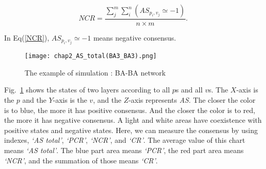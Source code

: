 \begin{equation}
NCR = \frac{{\sum\limits_j^m {\sum\limits_i^n {(A{S_{{p _i},{v _j}}} \simeq   - 1)} } }}{{n \times m}}.
\label{NCR}
\end{equation}

In Eq(\ref{NCR}), ${A{S_{{p _i},{v _j}}} \simeq  -1}$ means negative consensus.


\begin{figure}[!htb]
	\centering
	\texttt{[image: chap2\_AS\_total(BA3\_BA3).png]}
	\caption{The example of simulation : BA-BA network}
	\label{chap2_AS_total(BA3_BA3)}
\end{figure}

Fig.~\ref{chap2_AS_total(BA3_BA3)} shows the states of two layers according to all $p$s and all $v$s. The $X$-axis is the $p$ and the $Y$-axis is the $v$, and the $Z$-axis represents \textit{AS}. The closer the color is to blue, the more it has positive consensus. And the closer the color is to red, the more it has negative consensus. A light and white areas have coexistence with positive states and negative states. Here, we can measure the consensus by using indexes, \textit{`AS total'}, \textit{`PCR'}, \textit{`NCR'}, and \textit{`CR'}. The average value of this chart means \textit{`AS total'}. The blue part area means \textit{`PCR'}, the red part area means \textit{`NCR'}, and the summation of those means \textit{`CR'}. 



    
